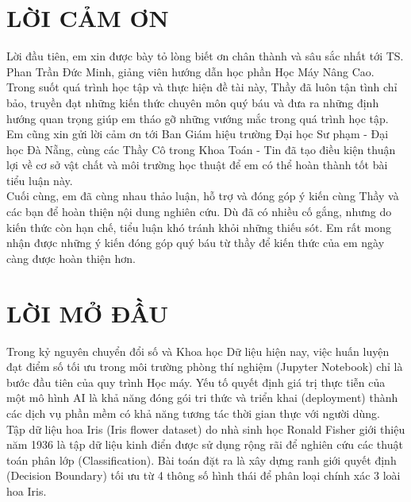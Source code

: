 \documentclass[14pt]{extarticle}
\begin{document}
		\section*{LỜI CẢM ƠN}

		
		\noindent Lời đầu tiên, em xin được bày tỏ lòng biết ơn chân thành và sâu sắc nhất tới TS. Phan Trần Đức Minh, giảng viên hướng dẫn học phần Học Máy Nâng Cao. Trong suốt quá trình học tập và thực hiện đề tài này, Thầy đã luôn tận tình chỉ bảo, truyền đạt những kiến thức chuyên môn quý báu và đưa ra những định hướng quan trọng giúp em tháo gỡ những vướng mắc trong quá trình học tập.\\
		
		\noindent Em cũng xin gửi lời cảm ơn tới Ban Giám hiệu trường Đại học Sư phạm - Đại học Đà Nẵng, cùng các Thầy Cô trong Khoa Toán - Tin đã tạo điều kiện thuận lợi về cơ sở vật chất và môi trường học thuật để em có thể hoàn thành tốt bài tiểu luận này.\\
		
		\noindent Cuối cùng, em đã cùng nhau thảo luận, hỗ trợ và đóng góp ý kiến cùng Thầy và các bạn để hoàn thiện nội dung nghiên cứu. Dù đã có nhiều cố gắng, nhưng do kiến thức còn hạn chế, tiểu luận khó tránh khỏi những thiếu sót. Em rất mong nhận được những ý kiến đóng góp quý báu từ thầy để kiến thức của em ngày càng được hoàn thiện hơn.
	
		\newpage
		\section*{LỜI MỞ ĐẦU}
		\vspace{1.em}
		
		Trong kỷ nguyên chuyển đổi số và Khoa học Dữ liệu hiện nay, việc huấn luyện đạt điểm số tối ưu trong môi trường phòng thí nghiệm (Jupyter Notebook) chỉ là bước đầu tiên của quy trình Học máy. Yếu tố quyết định giá trị thực tiễn của một mô hình AI là khả năng đóng gói tri thức và triển khai (deployment) thành các dịch vụ phần mềm có khả năng tương tác thời gian thực với người dùng.\\  
		
		\noindent Tập dữ liệu hoa Iris (Iris flower dataset) do nhà sinh học Ronald Fisher giới thiệu năm 1936 là tập dữ liệu kinh điển được sử dụng rộng rãi để nghiên cứu các thuật toán phân lớp (Classification). Bài toán đặt ra là xây dựng ranh giới quyết định (Decision Boundary) tối ưu từ 4 thông số hình thái để phân loại chính xác 3 loài hoa Iris.\\
		
\end{document}
